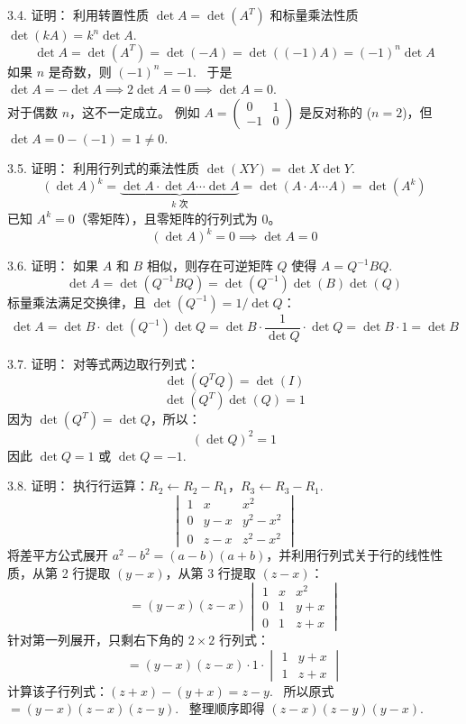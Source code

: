 \begin{exer}
3.4. 证明：
利用转置性质 $\det A = \det(A^T)$ 和标量乘法性质 $\det(kA) = k^n \det A$.~
$$ \det A = \det(A^T) = \det(-A) = \det((-1)A) = (-1)^n \det A $$
如果 $n$ 是奇数，则 $(-1)^n = -1$.~
于是 $\det A = -\det A \implies 2\det A = 0 \implies \det A = 0$.~
\\
对于偶数 $n$，这不一定成立。
例如 $A = \begin{pmatrix} 0 & 1 \\ -1 & 0 \end{pmatrix}$ 是反对称的 ($n=2$)，但 $\det A = 0 - (-1) = 1 \neq 0$.~

3.5. 证明：
利用行列式的乘法性质 $\det(XY) = \det X \det Y$.~
$$ (\det A)^k = \underbrace{\det A \cdot \det A \cdots \det A}_{k \text{ 次}} = \det(A \cdot A \cdots A) = \det(A^k) $$
已知 $A^k = 0$（零矩阵），且零矩阵的行列式为 0。
$$ (\det A)^k = 0 \implies \det A = 0 $$

3.6. 证明：
如果 $A$ 和 $B$ 相似，则存在可逆矩阵 $Q$ 使得 $A = Q^{-1} B Q$.~
$$ \det A = \det(Q^{-1} B Q) = \det(Q^{-1}) \det(B) \det(Q) $$
标量乘法满足交换律，且 $\det(Q^{-1}) = 1/\det Q$：
$$ \det A = \det B \cdot \det(Q^{-1}) \det Q = \det B \cdot \frac{1}{\det Q} \cdot \det Q = \det B \cdot 1 = \det B $$

3.7. 证明：
对等式两边取行列式：
$$ \det(Q^T Q) = \det(I) $$
$$ \det(Q^T) \det(Q) = 1 $$
因为 $\det(Q^T) = \det Q$，所以：
$$ (\det Q)^2 = 1 $$
因此 $\det Q = 1$ 或 $\det Q = -1$.~

3.8. 证明：
执行行运算：$R_2 \leftarrow R_2 - R_1$，$R_3 \leftarrow R_3 - R_1$.~
$$ \begin{vmatrix} 1 & x & x^2 \\ 0 & y-x & y^2-x^2 \\ 0 & z-x & z^2-x^2 \end{vmatrix} $$
将差平方公式展开 $a^2-b^2=(a-b)(a+b)$，并利用行列式关于行的线性性质，从第 2 行提取 $(y-x)$，从第 3 行提取 $(z-x)$：
$$ = (y-x)(z-x) \begin{vmatrix} 1 & x & x^2 \\ 0 & 1 & y+x \\ 0 & 1 & z+x \end{vmatrix} $$
针对第一列展开，只剩右下角的 $2 \times 2$ 行列式：
$$ = (y-x)(z-x) \cdot 1 \cdot \begin{vmatrix} 1 & y+x \\ 1 & z+x \end{vmatrix} $$
计算该子行列式：$(z+x) - (y+x) = z - y$.~
所以原式 $= (y-x)(z-x)(z-y)$.~
整理顺序即得 $(z-x)(z-y)(y-x)$.~


\end{exer}
